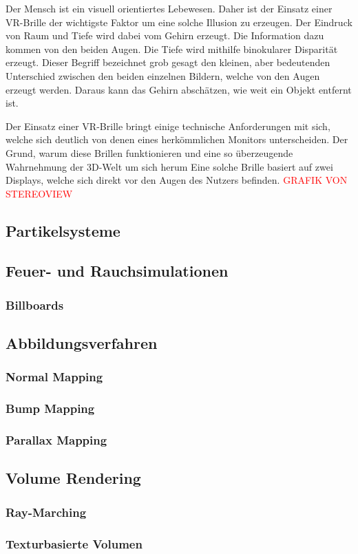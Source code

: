 Der Mensch ist ein visuell orientiertes Lebewesen. Daher ist der Einsatz einer VR-Brille 
der wichtigste Faktor um eine solche Illusion zu erzeugen. Der Eindruck von Raum und Tiefe wird
dabei vom Gehirn erzeugt. Die Information dazu kommen von den beiden Augen. Die Tiefe wird mithilfe 
binokularer Disparität erzeugt. Dieser Begriff bezeichnet grob gesagt den kleinen, aber bedeutenden
Unterschied zwischen den beiden einzelnen Bildern, welche von den Augen erzeugt werden. Daraus kann das Gehirn
abschätzen, wie weit ein Objekt entfernt ist. \parencite{Tauer2010}


Der Einsatz einer VR-Brille bringt einige technische Anforderungen mit sich, welche sich deutlich
von denen eines herkömmlichen Monitors unterscheiden. Der Grund, warum diese Brillen funktionieren und eine
so überzeugende Wahrnehmung der 3D-Welt um sich herum
Eine solche Brille basiert auf zwei Displays, welche
sich direkt vor den Augen des Nutzers befinden. \textcolor{red}{GRAFIK VON STEREOVIEW}


\subsection{Partikelsysteme}
\subsection{Feuer- und Rauchsimulationen}
\subsubsection{Billboards}
\subsection{Abbildungsverfahren}
\subsubsection{Normal Mapping}
\subsubsection{Bump Mapping}
\subsubsection{Parallax Mapping}
\subsection{Volume Rendering}
\subsubsection{Ray-Marching}
\subsubsection{Texturbasierte Volumen}


\newpage
